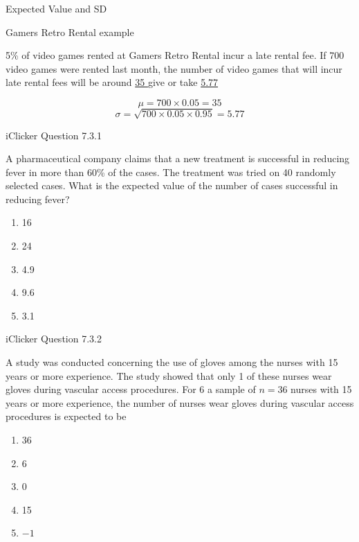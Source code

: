 \documentclass[14pt]{beamer}\usepackage[]{graphicx}\usepackage[]{color}
\begin{document}
\begin{frame}[fragile]{Expected Value and SD}

\vspace{-1cm}

\begin{center}{\tiny{Gamers Retro Rental example}} \end{center}

5\% of video games rented at Gamers Retro Rental incur a late rental fee. If 700 video games were rented last month, the number of video games that will incur late rental fees will be around
\underline{   35   } give or take \underline{   5.77   }
  
  
$$ \mu = 700 \times 0.05 = 35 $$  
$$ \sigma = \sqrt{700 \times 0.05 \times 0.95 } = 5.77$$

\end{frame}

\begin{frame}[fragile]{iClicker Question 7.3.1}

A pharmaceutical company claims that a new treatment is successful in reducing fever in more than 60\% of the cases. The treatment was tried on 40 randomly selected cases. What is the expected value of the number of cases successful in reducing fever?

\begin{enumerate}[A]
\item 16
\item 24
\item 4.9
\item 9.6
\item 3.1
\end{enumerate}
\end{frame}

\begin{frame}[fragile]{iClicker Question 7.3.2}

A study was conducted concerning the use of gloves among the
nurses with 15 years or more experience. The study showed that only
1 of these nurses wear gloves during vascular access procedures. For 6
a sample of $n = 36$ nurses with 15 years or more experience, the number of nurses wear gloves during vascular access procedures is expected to be

\begin{enumerate}[A]
\item 36
\item 6
\item 0
\item 15
\item $-1$
\end{enumerate}
\end{frame}
\end{document}
